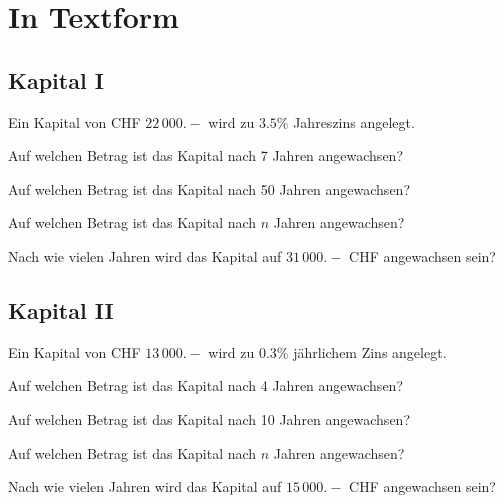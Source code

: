 \seitenUmbruchImAufgabenteil{}
\section{In Textform}
\subsection{Kapital I}
Ein Kapital von CHF $22\,000.-$ wird zu $3.5\%$ Jahreszins angelegt.
\begin{bbwAufgabenBlock}
\item Auf welchen Betrag ist das Kapital nach 7 Jahren
angewachsen? 
\item Auf welchen Betrag ist das Kapital nach 50 Jahren
angewachsen?  
\item Auf welchen Betrag ist das Kapital nach $n$ Jahren
angewachsen?   \noTRAINER{\seitenUmbruchImAufgabenteil{}}
\item Nach wie vielen Jahren wird das Kapital auf $31\,000.-$ CHF
angewachsen sein?  
\end{bbwAufgabenBlock}
\platzFuerBerechnungenBisEndeSeite{}
\subsection{Kapital II}
Ein Kapital von CHF $13\,000.-$ wird zu $0.3\%$ jährlichem Zins angelegt.
\begin{bbwAufgabenBlock}
\item Auf welchen Betrag ist das Kapital nach 4 Jahren
angewachsen?  
\item Auf welchen Betrag ist das Kapital nach 10 Jahren
angewachsen?  
\item Auf welchen Betrag ist das Kapital nach $n$ Jahren
angewachsen?   \noTRAINER{\seitenUmbruchImAufgabenteil{}}
\item Nach wie vielen Jahren wird das Kapital auf $15\,000.-$ CHF
angewachsen sein?  
\end{bbwAufgabenBlock}
\platzFuerBerechnungenBisEndeSeite{}
